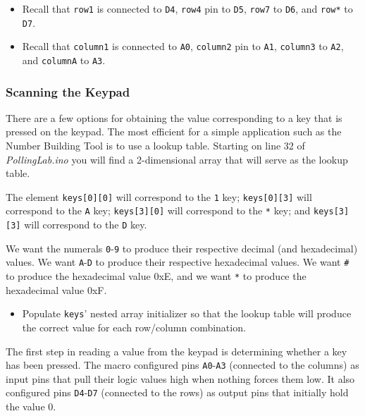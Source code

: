     \begin{itemize}
    \item Recall that \texttt{row1} is connected to \texttt{D4}, \texttt{row4}
        pin to \texttt{D5}, \texttt{row7} to \texttt{D6}, and \texttt{row*} to
        \texttt{D7}.
    \item Recall that \texttt{column1} is connected to \texttt{A0},
        \texttt{column2} pin to \texttt{A1}, \texttt{column3} to \texttt{A2},
        and \texttt{columnA} to \texttt{A3}.
    \end{itemize}

\subsubsection{Scanning the Keypad}

There are a few options for obtaining the value corresponding to a key that is
pressed on the keypad. The most efficient for a simple application such as the
Number Building Tool is to use a lookup table. Starting on line 32 of
\textit{PollingLab.ino} you will find a 2-dimensional array that will serve as
the lookup table.

The element \lstinline{keys[0][0]} will correspond to the
\texttt{1} key; \lstinline{keys[0][3]} will correspond to the \texttt{A} key;
\lstinline{keys[3][0]} will correspond to the \texttt{*} key; and
\lstinline{keys[3][3]} will correspond to the \texttt{D} key.

We want the numerals \texttt{0}-\texttt{9} to produce their respective decimal
(and hexadecimal) values. We want \texttt{A}-\texttt{D} to produce their
respective hexadecimal values. We want \texttt{\#} to produce the hexadecimal
value 0xE, and we want \texttt{*} to produce the hexadecimal value 0xF.

    \begin{itemize}
    \item Populate \lstinline{keys}' nested array initializer so that the
        lookup table will produce the correct value for each row/column
        combination.
    \end{itemize}

The first step in reading a value from the keypad is determining whether a key
has been pressed. The  macro configured pins
\texttt{A0}-\texttt{A3} (connected to the columns) as input pins that pull
their logic values high when nothing forces them low. It also configured pins
\texttt{D4}-\texttt{D7} (connected to the rows) as output pins that initially
hold the value 0.

